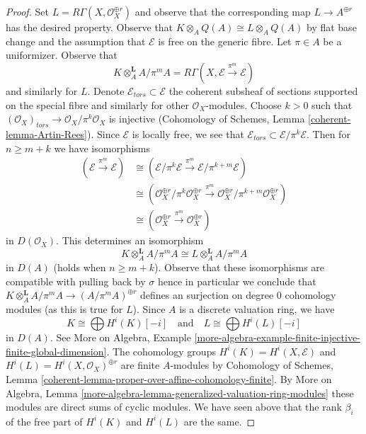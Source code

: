\begin{proof}
\medskip\noindent
Set $L = R\Gamma(X, \mathcal{O}_X^{\oplus r})$ and observe that the
corresponding map $L \to A^{\oplus r}$ has the desired property.
Observe that $K \otimes_A Q(A) \cong L \otimes_A Q(A)$
by flat base change and the assumption that $\mathcal{E}$
is free on the generic fibre. Let $\pi \in A$ be a uniformizer. Observe that
$$
K \otimes_A^\mathbf{L} A/\pi^m A =
R\Gamma(X, \mathcal{E} \xrightarrow{\pi^m} \mathcal{E})
$$
and similarly for $L$.
Denote $\mathcal{E}_{tors} \subset \mathcal{E}$ the coherent subsheaf of
sections supported on the special fibre and similarly for other
$\mathcal{O}_X$-modules. Choose $k > 0$ such that
$(\mathcal{O}_X)_{tors} \to \mathcal{O}_X/\pi^k \mathcal{O}_X$
is injective (Cohomology of Schemes, Lemma \ref{coherent-lemma-Artin-Rees}).
Since $\mathcal{E}$ is locally free, we see
that $\mathcal{E}_{tors} \subset \mathcal{E}/\pi^k\mathcal{E}$.
Then for $n \geq m + k$ we have isomorphisms
\begin{align*}
(\mathcal{E} \xrightarrow{\pi^m} \mathcal{E})
& \cong
(\mathcal{E}/\pi^k\mathcal{E} \xrightarrow{\pi^m}
\mathcal{E}/\pi^{k + m}\mathcal{E}) \\
& \cong
(\mathcal{O}_X^{\oplus r}/\pi^k\mathcal{O}_X^{\oplus r} \xrightarrow{\pi^m}
\mathcal{O}_X^{\oplus r}/\pi^{k + m}\mathcal{O}_X^{\oplus r}) \\
& \cong
(\mathcal{O}_X^{\oplus r} \xrightarrow{\pi^m} \mathcal{O}_X^{\oplus r})
\end{align*}
in $D(\mathcal{O}_X)$. This determines an isomorphism
$$
K \otimes_A^\mathbf{L} A/\pi^m A \cong L \otimes_A^\mathbf{L} A/\pi^m A
$$
in $D(A)$ (holds when $n \geq m + k$). Observe that these isomorphisms
are compatible with pulling back by $\sigma$ hence in particular
we conclude that
$K \otimes_A^\mathbf{L} A/\pi^m A \to (A/\pi^m A)^{\oplus r}$
defines an surjection on degree $0$ cohomology modules (as
this is true for $L$).
Since $A$ is a discrete valuation ring, we have
$$
K \cong \bigoplus H^i(K)[-i]
\quad\text{and}\quad
L \cong
\bigoplus H^i(L)[-i]
$$
in $D(A)$. See More on Algebra, Example
\ref{more-algebra-example-finite-injective-finite-global-dimension}.
The cohomology groups $H^i(K) = H^i(X, \mathcal{E})$ and
$H^i(L) = H^i(X, \mathcal{O}_X)^{\oplus r}$
are finite $A$-modules by Cohomology of Schemes, Lemma
\ref{coherent-lemma-proper-over-affine-cohomology-finite}.
By More on Algebra, Lemma
\ref{more-algebra-lemma-generalized-valuation-ring-modules}
these modules are direct sums of cyclic modules.
We have seen above that the rank $\beta_i$ of the
free part of $H^i(K)$ and $H^i(L)$ are the same.

\end{proof}
